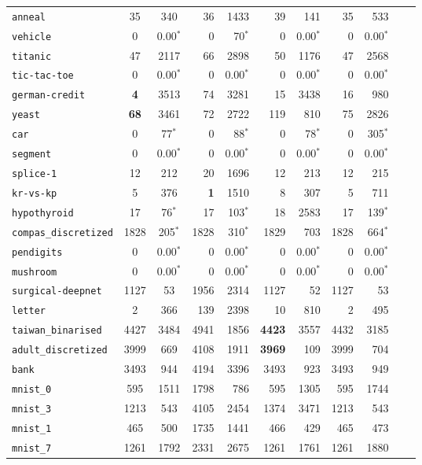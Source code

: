 \begin{tabular}{lccrrrrrrrr}
\texttt{anneal} & 35 & 340 & 36 & 1433 & 39 & 141 & 35 & 533\\
\texttt{vehicle} & 0 & 0.00$^*$ & 0 & 70$^*$ & 0 & 0.00$^*$ & 0 & 0.00$^*$\\
\texttt{titanic} & 47 & 2117 & 66 & 2898 & 50 & 1176 & 47 & 2568\\
\texttt{tic-tac-toe} & 0 & 0.00$^*$ & 0 & 0.00$^*$ & 0 & 0.00$^*$ & 0 & 0.00$^*$\\
\texttt{german-credit} & \textbf{4} & 3513 & 74 & 3281 & 15 & 3438 & 16 & 980\\
\texttt{yeast} & \textbf{68} & 3461 & 72 & 2722 & 119 & 810 & 75 & 2826\\
\texttt{car} & 0 & 77$^*$ & 0 & 88$^*$ & 0 & 78$^*$ & 0 & 305$^*$\\
\texttt{segment} & 0 & 0.00$^*$ & 0 & 0.00$^*$ & 0 & 0.00$^*$ & 0 & 0.00$^*$\\
\texttt{splice-1} & 12 & 212 & 20 & 1696 & 12 & 213 & 12 & 215\\
\texttt{kr-vs-kp} & 5 & 376 & \textbf{1} & 1510 & 8 & 307 & 5 & 711\\
\texttt{hypothyroid} & 17 & 76$^*$ & 17 & 103$^*$ & 18 & 2583 & 17 & 139$^*$\\
\texttt{compas\_discretized} & 1828 & 205$^*$ & 1828 & 310$^*$ & 1829 & 703 & 1828 & 664$^*$\\
\texttt{pendigits} & 0 & 0.00$^*$ & 0 & 0.00$^*$ & 0 & 0.00$^*$ & 0 & 0.00$^*$\\
\texttt{mushroom} & 0 & 0.00$^*$ & 0 & 0.00$^*$ & 0 & 0.00$^*$ & 0 & 0.00$^*$\\
\texttt{surgical-deepnet} & 1127 & 53 & 1956 & 2314 & 1127 & 52 & 1127 & 53\\
\texttt{letter} & 2 & 366 & 139 & 2398 & 10 & 810 & 2 & 495\\
\texttt{taiwan\_binarised} & 4427 & 3484 & 4941 & 1856 & \textbf{4423} & 3557 & 4432 & 3185\\
\texttt{adult\_discretized} & 3999 & 669 & 4108 & 1911 & \textbf{3969} & 109 & 3999 & 704\\
\texttt{bank} & 3493 & 944 & 4194 & 3396 & 3493 & 923 & 3493 & 949\\
\texttt{mnist\_0} & 595 & 1511 & 1798 & 786 & 595 & 1305 & 595 & 1744\\
\texttt{mnist\_3} & 1213 & 543 & 4105 & 2454 & 1374 & 3471 & 1213 & 543\\
\texttt{mnist\_1} & 465 & 500 & 1735 & 1441 & 466 & 429 & 465 & 473\\
\texttt{mnist\_7} & 1261 & 1792 & 2331 & 2675 & 1261 & 1761 & 1261 & 1880\\

\end{tabular}
